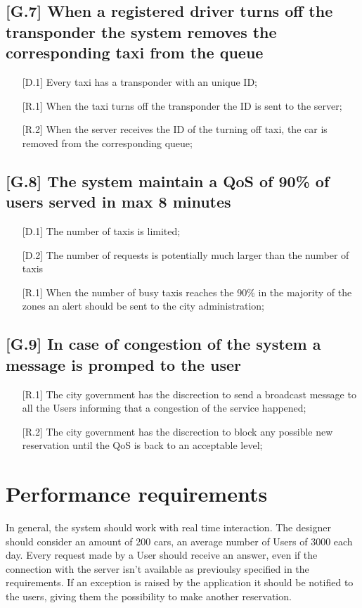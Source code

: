 \documentclass[12pt,a4paper]{book}
\begin{document}
			\subsection{[G.7] When a registered driver turns off the transponder the system removes the corresponding taxi from the queue}
			\begin{itemize}
				\item[\textbullet] [D.1] Every taxi has a transponder with an unique ID;
				\item[\textbullet] [R.1] When the taxi turns off the transponder the ID is sent to the server;
				\item[\textbullet] [R.2] When the server receives the ID of the turning off taxi, the car is removed from the corresponding queue;
			\end{itemize}
			\subsection{[G.8] The system maintain a QoS of 90\% of users served in max 8 minutes}
			\begin{itemize}
				\item[\textbullet] [D.1] The number of taxis is limited;
				\item[\textbullet] [D.2] The number of requests is potentially much larger than the number of taxis
				\item[\textbullet] [R.1] When the number of busy taxis reaches the 90\% in the majority of the zones an alert should be sent to the city administration;
			\end{itemize}
			\subsection{[G.9] In case of congestion of the system a message is promped to the user}
			\begin{itemize}
				\item[\textbullet] [R.1] The city government has the discrection to send a broadcast message to all the Users informing that a congestion of the service happened;
				\item[\textbullet] [R.2] The city government has the discrection to block any possible new reservation until the QoS is back to an acceptable level;
			\end{itemize}
		\section{Performance requirements}
		In general, the system should work with real time interaction. The designer should consider an amount of 200 cars, an average number of Users of 3000 each day.
		Every request made by a User should receive an answer, even if the connection with the server isn't available as previoulsy specified in the requirements.
		If an exception is raised by the application it should be notified to the users, giving them the possibility to make another reservation.
\end{document}
